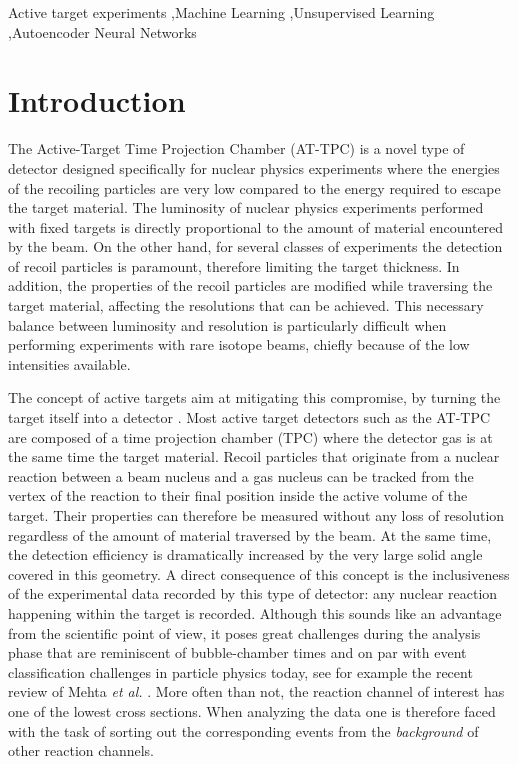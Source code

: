 \documentclass[review,sort&compress]{elsarticle}
\begin{document}
\begin{frontmatter}
\begin{keyword}
Active target experiments \sep Machine Learning \sep Unsupervised Learning \sep Autoencoder Neural Networks



\end{keyword}

\end{frontmatter}

\section{Introduction}\label{sec:intro}



The Active-Target Time Projection Chamber (AT-TPC) \cite{Bradt2017} is a novel type of detector designed specifically for nuclear physics experiments where the energies of the recoiling particles are very low compared to the energy required to escape the target material. The luminosity of nuclear physics experiments performed with fixed targets is directly proportional to the amount of material encountered by the beam. On the other hand, for several classes of experiments the detection of recoil particles is paramount, therefore limiting the target thickness. In addition, the properties of the recoil particles are modified while traversing the target material, affecting the resolutions that can be achieved. This necessary balance between luminosity and resolution is particularly difficult when performing experiments with rare isotope beams, chiefly because of the low intensities available. 

The concept of active targets aim at mitigating this compromise, by turning the target itself into a detector \cite{BECEIRONOVO2015}. Most active target detectors such as the AT-TPC are composed of a time projection chamber (TPC) where the detector gas is at the same time the target material. Recoil particles that originate from a nuclear reaction between a beam nucleus and a gas nucleus can be tracked from the vertex of the reaction to their final position inside the active volume of the target. Their properties can therefore be measured without any loss of resolution regardless of the amount of material traversed by the beam. At the same time, the detection efficiency is dramatically increased by the very large solid angle covered in this geometry. A direct consequence of this concept is the inclusiveness of the experimental data recorded by this type of detector: any nuclear reaction happening within the target is recorded. Although this sounds like an advantage from the scientific point of view, it poses great challenges during the analysis phase that are reminiscent 
of bubble-chamber times and on par with event classification challenges in particle physics today, see for example the recent review of Mehta {\em et al.} \cite{mehta2019}. More often than not, the reaction channel of interest has one of the lowest cross sections. When analyzing the data one is therefore faced with the task of sorting out the corresponding events from the {\em background} of other reaction channels. 
\end{document}
